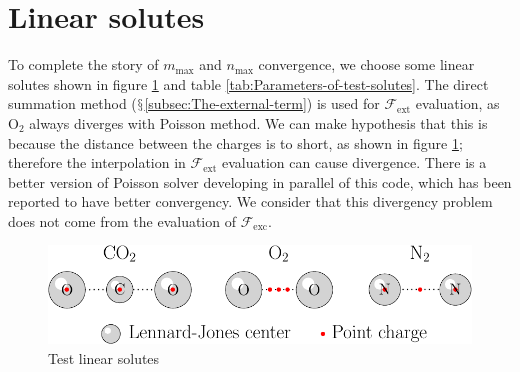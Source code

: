 \section{Linear solutes}

To complete the story of $m_{\max}$ and $n_{\max}$ convergence,
we choose some linear solutes shown in figure \ref{fig:Test-linear-solutes}
and table \ref{tab:Parameters-of-test-solutes}. The direct summation
method ($\mathsection$\ref{subsec:The-external-term}) is used for
$\mathcal{F}_{\mathrm{ext}}$ evaluation, as $\mathrm{O}_{2}$ always
diverges with Poisson method. We can make hypothesis that this is
because the distance between the charges is to short, as shown in
figure \ref{fig:Test-linear-solutes}; therefore the interpolation
in $\mathcal{F}_{\mathrm{ext}}$ evaluation can cause divergence.
There is a better version of Poisson solver developing in parallel
of this code, which has been reported to have better convergency.
We consider that this divergency problem does not come from the evaluation
of $\mathcal{F}_{\mathrm{exc}}$.

\begin{figure}[h]
\begin{centering}
\includegraphics[scale=0.6]{_figure/app_solute}
\par\end{centering}
\caption{Test linear solutes\label{fig:Test-linear-solutes}}
\end{figure}

